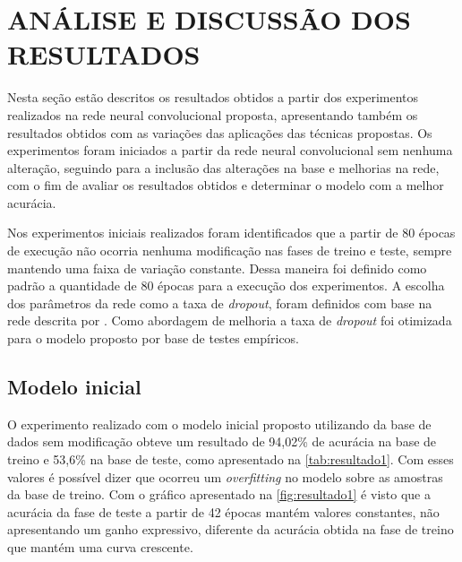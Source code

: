 
\chapter{ANÁLISE E DISCUSSÃO DOS RESULTADOS}

\label{chap:resultados}

Nesta seção estão descritos os resultados obtidos a partir dos experimentos realizados na rede neural convolucional proposta, apresentando também os resultados obtidos com as variações das aplicações das técnicas propostas.
 Os experimentos foram iniciados a partir da rede neural convolucional sem nenhuma alteração, seguindo para a inclusão das alterações na base e melhorias na rede, com o fim de avaliar os resultados obtidos e determinar o modelo com a melhor acurácia.


\par Nos experimentos iniciais realizados foram identificados que a partir de 80 épocas de execução não ocorria nenhuma modificação nas fases de treino e teste, sempre mantendo uma faixa de variação constante. Dessa maneira foi definido como padrão a quantidade de 80 épocas para a execução dos experimentos. A escolha dos parâmetros da rede como a taxa de \textit{dropout}, foram definidos com base na rede descrita por . Como abordagem de melhoria a taxa de \textit{dropout} foi otimizada para o modelo proposto por base de testes empíricos.


\section{Modelo inicial}
O experimento realizado com o modelo inicial proposto utilizando da base de dados sem modificação obteve um resultado de 94,02\% de acurácia na base de treino e 53,6\% na base de teste, como apresentado na \autoref{tab:resultado1}. Com esses valores é possível dizer que ocorreu um \textit{overfitting} no modelo sobre as amostras da base de treino. Com o gráfico apresentado na \autoref{fig:resultado1} é visto que a acurácia da fase de teste a partir de 42 épocas mantém valores constantes, não apresentando um ganho expressivo, diferente da acurácia obtida na fase de treino que mantém uma curva crescente.


